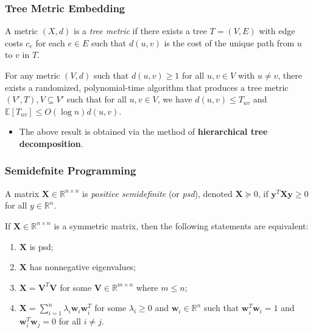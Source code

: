 \documentclass{beamer}
\newcommand{\RR}{\mathbb{R}}
\newcommand{\EE}{\mathbb{E}}
\begin{document}
    \begin{frame}
        \frametitle{Tree Metric Embedding}
    
        \begin{definition}
            A metric $(X, d)$ is a \emph{tree metric} if there exists a tree $T = (V, E)$ with edge costs $c_e$ for each $e \in E$ such that $d(u, v)$ is the cost of the unique path from $u$ to $v$ in $T$.
        \end{definition}

        \pause

        \begin{theorem}
            For any metric $(V, d)$ such that $d(u, v) \geq 1$ for all $u, v \in V$ with $u \neq v$, there exists a randomized, polynomial-time algorithm that produces a tree metric $(V', T), V \subseteq V'$ such that for all $u, v \in V$, we have $d(u, v) \leq T_{uv}$ and $\EE[T_{uv}] \leq O(\log n) d(u, v)$.
        \end{theorem}

        \pause

        \begin{itemize}
            \item The above result is obtained via the method of {\bf hierarchical tree decomposition}.
        \end{itemize}
    \end{frame}

    \begin{frame}
        \frametitle{Semidefnite Programming}
    
        \begin{definition}
            A matrix $\mathbf X \in \RR^{n \times n}$ is \emph{positive semidefinite} (or \emph{psd}), denoted $\mathbf X \succeq 0$, if $\mathbf y^T \mathbf X \mathbf y \geq 0$ for all $y \in \RR^n$.
        \end{definition}

        \begin{fact}
            If $\mathbf X \in \RR^{n \times n}$ is a symmetric matrix, then the following statements are equivalent:
            \begin{enumerate}
                \item $\mathbf X$ is psd;
                \item $\mathbf X$ has nonnegative eigenvalues;
                \item $\mathbf X = \mathbf V^T \mathbf V$ for some $\mathbf V \in \RR^{m \times n}$ where $m \leq n$;
                \item $\mathbf X = \sum_{i = 1}^n \lambda_i \mathbf w_i \mathbf w_i^T$ for some $\lambda_i \geq 0$ and $\mathbf w_i \in \RR^n$ such that $\mathbf w_i^T \mathbf w_i = 1$ and $\mathbf w_i^T \mathbf w_j = 0$ for all $i \neq j$.
            \end{enumerate}
        \end{fact}
    \end{frame}
\end{document}
